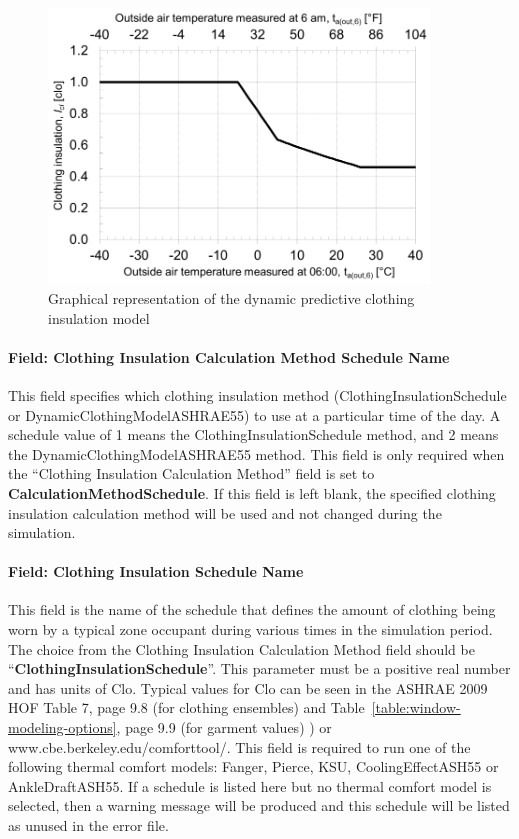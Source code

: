 \begin{figure}[hbtp] %
\centering
\includegraphics[width=0.9\textwidth, height=0.9\textheight, keepaspectratio=true]{media/image083.png}
\caption{Graphical representation of the dynamic predictive clothing insulation model \protect \label{fig:graphical-representation-of-the-dynamic}}
\end{figure}

\paragraph{Field: Clothing Insulation Calculation Method Schedule Name}\label{field-clothing-insulation-calculation-method-schedule-name}

This field specifies which clothing insulation method (ClothingInsulationSchedule or DynamicClothingModelASHRAE55) to use at a particular time of the day. A schedule value of 1 means the ClothingInsulationSchedule method, and 2 means the DynamicClothingModelASHRAE55 method. This field is only required when the ``Clothing Insulation Calculation Method'' field is set to \textbf{CalculationMethodSchedule}. If this field is left blank, the specified clothing insulation calculation method will be used and not changed during the simulation.

\paragraph{Field: Clothing Insulation Schedule Name}\label{field-clothing-insulation-schedule-name}

This field is the name of the schedule that defines the amount of clothing being worn by a typical zone occupant during various times in the simulation period. The choice from the Clothing Insulation Calculation Method field should be ``\textbf{ClothingInsulationSchedule}''. This parameter must be a positive real number and has units of Clo. Typical values for Clo can be seen in the ASHRAE 2009 HOF Table 7, page 9.8 (for clothing ensembles) and Table~\ref{table:window-modeling-options}, page 9.9 (for garment values) ) or www.cbe.berkeley.edu/comforttool/. This field is required to run one of the following thermal comfort models: Fanger, Pierce, KSU, CoolingEffectASH55 or AnkleDraftASH55. If a schedule is listed here but no thermal comfort model is selected, then a warning message will be produced and this schedule will be listed as unused in the error file.

